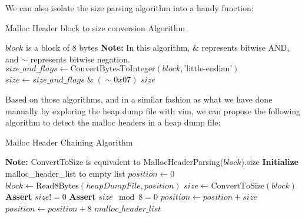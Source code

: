     We can also isolate the size parsing algorithm into a handy function:

    \begin{algorithm}[H]\label{alg:convert_to_size}
        \caption{Malloc Header block to size conversion Algorithm}
        \begin{algorithmic}[1]
            \Require $block$ is a block of 8 bytes
            \State \textbf{Note:} In this algorithm, $\&$ represents bitwise AND, and $\sim$ represents bitwise negation.
            \State $size\_and\_flags \leftarrow \text{ConvertBytesToInteger}(block, \text{'little-endian'})$
            \State $size \leftarrow size\_and\_flags \; \& \; (\sim 0x07)$ 
            \State \Return $size$
        \EndProcedure
        \end{algorithmic}
    \end{algorithm}

    Based on those algorithms, and in a similar fashion as what we have done manually by exploring the heap dump file with vim, we can propose the following algorithm to detect the malloc headers in a heap dump file:

    \begin{algorithm}[H]\label{alg:malloc_header_chaining}
        \caption{Malloc Header Chaining Algorithm}
        \begin{algorithmic}[1]
            \State \textbf{Note:} ConvertToSize is equivalent to MallocHeaderParsing($block$).size 
            \State \textbf{Initialize} malloc\_header\_list to empty list
            \State $position \gets 0$
                \State $block \gets \text{Read8Bytes}(heapDumpFile, position)$
                    \State $size \gets \text{ConvertToSize}(block)$ 
                    \State \textbf{Assert} $size != 0$
                    \State \textbf{Assert} $size \mod 8 = 0$ 
                    \State $position \gets position + size$ 
                \Else
                    \State $position \gets position + 8$
                \EndIf
            \EndWhile
            \State \Return $malloc\_header\_list$
        \EndProcedure
        \end{algorithmic}
    \end{algorithm}

